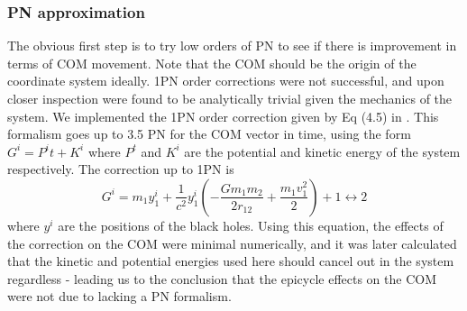 \documentclass{article}
\begin{document}
\subsubsection{PN approximation}
The obvious first step is to try low orders of PN to see if there is improvement in terms of COM movement. Note that the COM should be the origin of the coordinate system ideally.
1PN order corrections were not successful, and upon closer inspection were found to be analytically trivial given the mechanics of the system. We implemented the 1PN order correction given by Eq (4.5) in \cite{dA01}. This formalism goes up to 3.5 PN for the COM vector in time, using the form $G^{i} = P^{i}t + K^{i}$ where $P^{t}$ and $K^{i}$ are the potential and kinetic energy of the system respectively. The correction up to 1PN is
\begin{equation}
G^{i} = m_1y^{i}_1 + \frac{1}{c^2} { y_1^{i} (-\frac{Gm_1m_2}{2r_{12}} + \frac{m_1v_1^{2}}{2} ) } + 1 \longleftrightarrow 2
\end{equation}
where $y^{i}$ are the positions of the black holes.
Using this equation, the effects of the correction on the COM were minimal numerically, and it was later calculated that the kinetic and potential energies used here should cancel out in the system regardless - leading us to the conclusion that the epicycle effects on the COM were not due to lacking a PN formalism.
\end{document}
